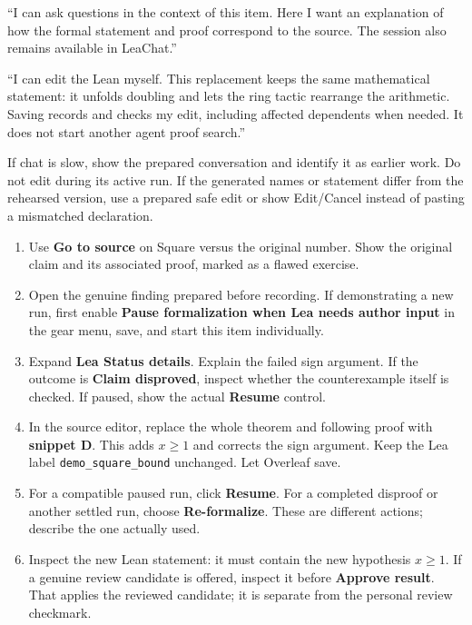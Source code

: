 \say
``I can ask questions in the context of this item. Here I want an explanation
of how the formal statement and proof correspond to the source. The session
also remains available in LeaChat.''

``I can edit the Lean myself. This replacement keeps the same mathematical
statement: it unfolds doubling and lets the ring tactic rearrange the
arithmetic. Saving records and checks my edit, including affected dependents
when needed. It does not start another agent proof search.''

\fallback
If chat is slow, show the prepared conversation and identify it as earlier work.
Do not edit during its active run. If the generated names or statement differ
from the rehearsed version, use a prepared safe edit or show Edit/Cancel instead
of pasting a mismatched declaration.

\clearpage
{}

\click
\begin{enumerate}
  \item Use \textbf{Go to source} on Square versus the original number. Show
    the original claim and its associated proof, marked as a flawed exercise.
  \item Open the genuine finding prepared before recording. If demonstrating a
    new run, first enable \textbf{Pause formalization when Lea needs author input}
    in the gear menu, save, and start this item individually.
  \item Expand \textbf{Lea Status details}. Explain the failed sign argument.
    If the outcome is \textbf{Claim disproved}, inspect whether the counterexample
    itself is checked. If paused, show the actual \textbf{Resume} control.
  \item In the source editor, replace the whole theorem and following proof
    with \textbf{snippet D}. This adds $x\ge1$ and corrects the sign argument.
    Keep the Lea label \texttt{demo\_square\_bound} unchanged. Let Overleaf save.
  \item For a compatible paused run, click \textbf{Resume}. For a completed
    disproof or another settled run, choose \textbf{Re-formalize}. These are
    different actions; describe the one actually used.
  \item Inspect the new Lean statement: it must contain the new hypothesis
    $x\ge1$. If a genuine review candidate is offered, inspect it before
    \textbf{Approve result}. That applies the reviewed candidate; it is separate
    from the personal review checkmark.
\end{enumerate}

